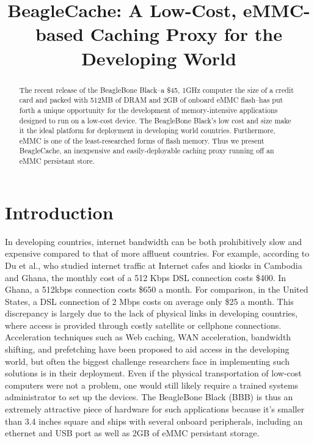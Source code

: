 \documentclass[pageno]{jpaper}
\begin{document}
\title{
BeagleCache: A Low-Cost, eMMC-based Caching Proxy for the Developing World}

\date{}
\maketitle

\thispagestyle{empty}

\begin{abstract}
The recent release of the BeagleBone Black--a \$45, 1GHz computer the size of a credit card and packed with 512MB of DRAM and 2GB of onboard eMMC flash--has put forth a unique opportunity for the development of memory-intensive applications designed to run on a low-cost device.  The BeagleBone Black's low cost and size make it the ideal platform for deployment in developing world countries.  Furthermore, eMMC is one of the least-researched forms of flash memory. Thus we present BeagleCache, an inexpensive and easily-deployable caching proxy running off an eMMC persistant store. 
\end{abstract}

\section{Introduction}

In developing countries, internet bandwidth can be both prohibitively slow and expensive compared to that of more affluent countries.  For example, according to Du et al.\cite{Du}, who studied internet traffic at Internet cafes and kiosks in Cambodia and Ghana, the monthly cost of a 512 Kbps DSL connection costs \$400. In Ghana, a 512kbps connection costs \$650 a month. For comparison, in the United States, a DSL connection of 2 Mbps costs on average only \$25 a month.  This discrepancy is largely due to the lack of physical links in developing countries, where access is provided through costly satellite or cellphone connections.  Acceleration techniques such as Web caching, WAN acceleration, bandwidth shifting, and prefetching have been proposed to aid access in the developing world\cite{firstclass}, but often the biggest challenge researchers face in implementing such solutions is in their deployment. Even if the physical transportation of low-cost computers were not a problem, one would still likely require a trained systems administrator to set up the devices. The BeagleBone Black (BBB) is thus an extremely attractive piece of hardware for such applications because it's smaller than 3.4 inches square and ships with several onboard peripherals, including an ethernet and USB port as well as 2GB of eMMC persistant storage. 
\end{document}
